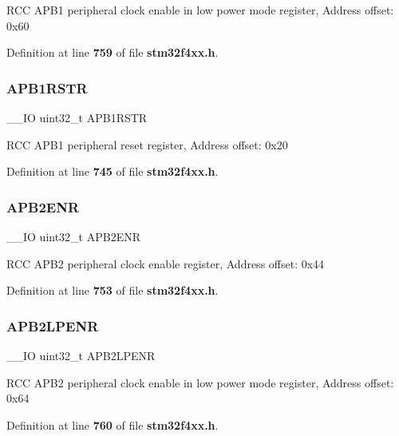 R\+CC A\+P\+B1 peripheral clock enable in low power mode register, Address offset\+: 0x60 

Definition at line \textbf{ 759} of file \textbf{ stm32f4xx.\+h}.

\mbox{\label{structRCC__TypeDef_a7da5d372374bc59e9b9af750b01d6a78}} 
\subsubsection{A\+P\+B1\+R\+S\+TR}
{\footnotesize\ttfamily \+\_\+\+\_\+\+IO uint32\+\_\+t A\+P\+B1\+R\+S\+TR}

R\+CC A\+P\+B1 peripheral reset register, Address offset\+: 0x20 

Definition at line \textbf{ 745} of file \textbf{ stm32f4xx.\+h}.

\mbox{\label{structRCC__TypeDef_acc7bb47dddd2d94de124f74886d919be}} 
\subsubsection{A\+P\+B2\+E\+NR}
{\footnotesize\ttfamily \+\_\+\+\_\+\+IO uint32\+\_\+t A\+P\+B2\+E\+NR}

R\+CC A\+P\+B2 peripheral clock enable register, Address offset\+: 0x44 

Definition at line \textbf{ 753} of file \textbf{ stm32f4xx.\+h}.

\mbox{\label{structRCC__TypeDef_aba51c57f9506e14a6f5983526c78943b}} 
\subsubsection{A\+P\+B2\+L\+P\+E\+NR}
{\footnotesize\ttfamily \+\_\+\+\_\+\+IO uint32\+\_\+t A\+P\+B2\+L\+P\+E\+NR}

R\+CC A\+P\+B2 peripheral clock enable in low power mode register, Address offset\+: 0x64 

Definition at line \textbf{ 760} of file \textbf{ stm32f4xx.\+h}.

